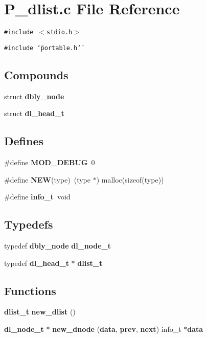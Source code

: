 \section{P\_\-dlist.c File Reference}
\label{P__dlist_8c}
{\tt \#include $<$stdio.h$>$}\par
{\tt \#include \char`\"{}portable.h\char`\"{}}\par
\subsection*{Compounds}
\begin{CompactItemize}
\item 
struct {\bf dbly\_\-node}
\item 
struct {\bf dl\_\-head\_\-t}
\end{CompactItemize}
\subsection*{Defines}
\begin{CompactItemize}
\item 
\#define {\bf MOD\_\-DEBUG}\ 0
\item 
\#define {\bf NEW}(type)\ (type $\ast$) malloc(sizeof(type))
\item 
\#define {\bf info\_\-t}\ void
\end{CompactItemize}
\subsection*{Typedefs}
\begin{CompactItemize}
\item 
typedef {\bf dbly\_\-node} {\bf dl\_\-node\_\-t}
\item 
typedef {\bf dl\_\-head\_\-t} $\ast$ {\bf dlist\_\-t}
\end{CompactItemize}
\subsection*{Functions}
\begin{CompactItemize}
\item 
{\bf dlist\_\-t} {\bf new\_\-dlist} ()
\item 
{\bf dl\_\-node\_\-t} $\ast$ {\bf new\_\-dnode} ({\bf data}, {\bf prev}, {\bf next}) info\_\-t $\ast${\bf data}
\end{CompactItemize}
